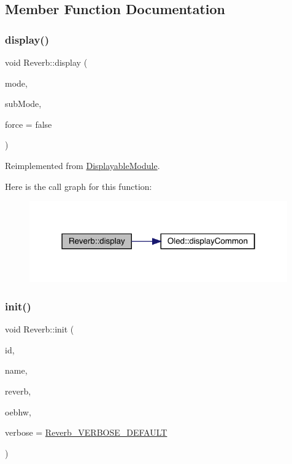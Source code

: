 \subsection{Member Function Documentation}
\mbox{\label{class_reverb_aaf90c9b334f7e1c869c5b406ada68135}} 
\subsubsection{\texorpdfstring{display()}{display()}}
{\footnotesize\ttfamily void Reverb\+::display (\begin{DoxyParamCaption}\item[{int}]{mode,  }\item[{int}]{sub\+Mode,  }\item[{bool}]{force = {\ttfamily false} }\end{DoxyParamCaption})\hspace{0.3cm}{\ttfamily [virtual]}}



Reimplemented from \mbox{\hyperlink{class_displayable_module_a02de26d62ef508cae9ed07920e21784d}{Displayable\+Module}}.

Here is the call graph for this function\+:\nopagebreak
\begin{figure}[H]
\begin{center}
\leavevmode
\includegraphics[width=315pt]{class_reverb_aaf90c9b334f7e1c869c5b406ada68135_cgraph}
\end{center}
\end{figure}
\mbox{\label{class_reverb_ae82272ebf02fe46091a72eb04132a1c6}} 
\subsubsection{\texorpdfstring{init()}{init()}}
{\footnotesize\ttfamily void Reverb\+::init (\begin{DoxyParamCaption}\item[{int}]{id,  }\item[{char $\ast$}]{name,  }\item[{Audio\+Effect\+Reverb $\ast$}]{reverb,  }\item[{\mbox{\hyperlink{class_open_effects_box_h_w}{Open\+Effects\+Box\+HW}} $\ast$}]{oebhw,  }\item[{int}]{verbose = {\ttfamily \mbox{\hyperlink{_reverb_8h_a4d31e478011f0f65e621d80f142d6f8f}{Reverb\+\_\+\+V\+E\+R\+B\+O\+S\+E\+\_\+\+D\+E\+F\+A\+U\+LT}}} }\end{DoxyParamCaption})}

